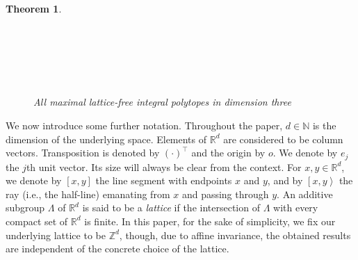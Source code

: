 \documentclass[a4paper]{article}
\theoremstyle{plain}
\newtheorem{theorem}[nn]{Theorem}
\begin{document}
\begin{theorem}
\begin{figure}[ht]
  \centering

  
  \qquad
  
  \qquad
  \\
  
  
  \qquad
  \qquad
  \\
  
  \qquad
  
  \qquad
  \\
  
  
  \qquad
  \qquad
  \caption{All maximal lattice-free integral polytopes in dimension three}
  \label{fig.main.thm}
\end{figure}

\end{theorem}

We now introduce some further notation.
Throughout the paper, $d \in {\mathbb{N}}$ is the dimension of the
underlying space.
Elements of ${\mathbb{R}}^d$ are considered to be column vectors.
Transposition is denoted by $(\cdot)^\top$ and the origin by
$o$.
We denote by $e_{j}$ the $j$th unit vector.
Its size will always be clear from the context.
For $x, y \in {\mathbb{R}}^d$, we denote by $[x,y]$ the line
segment with endpoints $x$ and $y$, and by ${\left[{x,y}\right>}$ the
ray (i.e., the half-line) emanating from $x$ and passing
through $y$.
An additive subgroup $\Lambda$ of ${\mathbb{R}}^d$ is said to be a
\emph{lattice} if the intersection of $\Lambda$ with every
compact set of ${\mathbb{R}}^d$ is finite.
In this paper, for the sake of simplicity, we fix our
underlying lattice to be ${\mathbb{Z}}^d$, though, due to affine
invariance, the obtained results are independent of the
concrete choice of the lattice.
\end{document}
